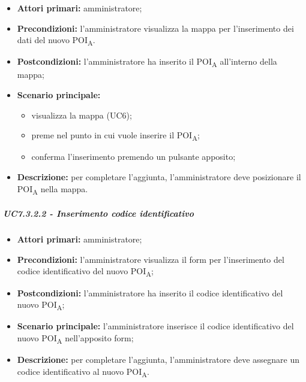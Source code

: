 \begin{itemize}

   \item   \textbf{Attori primari:} amministratore;

\item   \textbf{Precondizioni:} l'amministratore visualizza la mappa per l'inserimento dei dati del nuovo POI\textsubscript{A}.

  \item   \textbf{Postcondizioni:} l'amministratore ha inserito il POI\textsubscript{A} all'interno della mappa; 

   \item   \textbf{Scenario principale:}

    \begin{itemize}
        \item visualizza la mappa (UC6);

        \item preme nel punto in cui vuole inserire il POI\textsubscript{A};
		     \item conferma l'inserimento premendo un pulsante apposito;

   \end{itemize}

   \item   \textbf{Descrizione:} per completare l'aggiunta, l'amministratore deve posizionare il POI\textsubscript{A} nella mappa.



\end{itemize}



\subparagraph{UC7.3.2.2 - Inserimento codice identificativo}

\begin{itemize}

  \item   \textbf{Attori primari:} amministratore;

   \item   \textbf{Precondizioni:} l'amministratore visualizza il form per l'inserimento del codice identificativo del nuovo POI\textsubscript{A};

   \item   \textbf{Postcondizioni:} l'amministratore ha inserito il codice identificativo del nuovo POI\textsubscript{A}; 

   \item   \textbf{Scenario principale:} l'amministratore inserisce il codice identificativo del nuovo POI\textsubscript{A} nell'apposito form;

   \item   \textbf{Descrizione:} per completare l'aggiunta, l'amministratore deve assegnare un codice identificativo al nuovo POI\textsubscript{A}.



\end{itemize}



